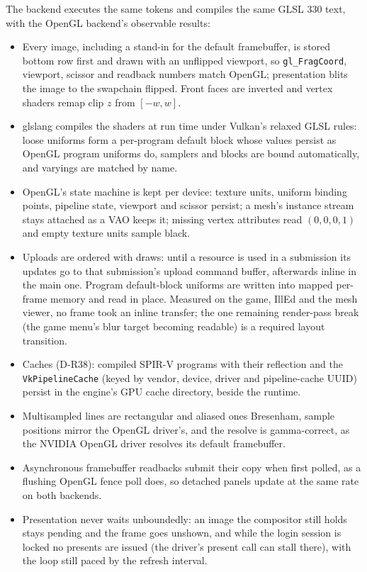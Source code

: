 The backend executes the same tokens and compiles the same GLSL 330 text, with
the OpenGL backend's observable results:
\begin{itemize}
  \item Every image, including a stand-in for the default framebuffer, is
        stored bottom row first and drawn with an unflipped viewport, so
        \texttt{gl\_FragCoord}, viewport, scissor and readback numbers match
        OpenGL; presentation blits the image to the swapchain flipped. Front
        faces are inverted and vertex shaders remap clip $z$ from $[-w,w]$.
  \item glslang compiles the shaders at run time under Vulkan's relaxed GLSL
        rules: loose uniforms form a per-program default block whose values
        persist as OpenGL program uniforms do, samplers and blocks are bound
        automatically, and varyings are matched by name.
  \item OpenGL's state machine is kept per device: texture units, uniform
        binding points, pipeline state, viewport and scissor persist; a mesh's
        instance stream stays attached as a VAO keeps it; missing vertex
        attributes read $(0,0,0,1)$ and empty texture units sample black.
  \item Uploads are ordered with draws: until a resource is used in a
        submission its updates go to that submission's upload command buffer,
        afterwards inline in the main one. Program default-block uniforms are
        written into mapped per-frame memory and read in place. Measured on
        the game, IllEd and the mesh viewer, no frame took an inline transfer;
        the one remaining render-pass break (the game menu's blur target
        becoming readable) is a required layout transition.
  \item Caches (D-R38): compiled SPIR-V programs with their reflection and the
        \texttt{VkPipelineCache} (keyed by vendor, device, driver and
        pipeline-cache UUID) persist in the engine's GPU cache directory,
         beside the runtime.
  \item Multisampled lines are rectangular and aliased ones Bresenham, sample
        positions mirror the OpenGL driver's, and the resolve is gamma-correct,
        as the NVIDIA OpenGL driver resolves its default framebuffer.
  \item Asynchronous framebuffer readbacks submit their copy when first polled,
        as a flushing OpenGL fence poll does, so detached panels update at the
        same rate on both backends.
  \item Presentation never waits unboundedly: an image the compositor still
        holds stays pending and the frame goes unshown, and while the login
        session is locked no presents are issued (the driver's present call
        can stall there), with the loop still paced by the refresh interval.
\end{itemize}

